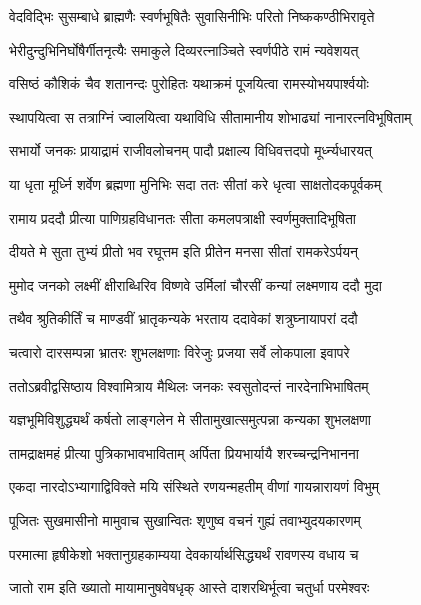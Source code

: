 \twolineshloka
{वेदविद्भिः सुसम्बाधे ब्राह्मणैः स्वर्णभूषितैः}
{सुवासिनीभिः परितो निष्ककण्ठीभिरावृते} %

\twolineshloka
{भेरीदुन्दुभिनिर्घोषैर्गीतनृत्यैः समाकुले}
{दिव्यरत्नाञ्चिते स्वर्णपीठे रामं न्यवेशयत्} %

\twolineshloka
{वसिष्ठं कौशिकं चैव शतानन्दः पुरोहितः}
{यथाक्रमं पूजयित्वा रामस्योभयपार्श्वयोः} %

\twolineshloka
{स्थापयित्वा स तत्राग्निं ज्वालयित्वा यथाविधि}
{सीतामानीय शोभाढ्यां नानारत्नविभूषिताम्} %

\twolineshloka
{सभार्यो जनकः प्रायाद्रामं राजीवलोचनम्}
{पादौ प्रक्षाल्य विधिवत्तदपो मूर्ध्न्यधारयत्} %

\twolineshloka
{या धृता मूर्ध्नि शर्वेण ब्रह्मणा मुनिभिः सदा}
{ततः सीतां करे धृत्वा साक्षतोदकपूर्वकम्} %

\twolineshloka
{रामाय प्रददौ प्रीत्या पाणिग्रहविधानतः}
{सीता कमलपत्राक्षी स्वर्णमुक्तादिभूषिता} %

\twolineshloka
{दीयते मे सुता तुभ्यं प्रीतो भव रघूत्तम}
{इति प्रीतेन मनसा सीतां रामकरेऽर्पयन्} %

\twolineshloka
{मुमोद जनको लक्ष्मीं क्षीराब्धिरिव विष्णवे}
{उर्मिलां चौरसीं कन्यां लक्ष्मणाय ददौ मुदा} %

\twolineshloka
{तथैव श्रुतिकीर्तिं च माण्डवीं भ्रातृकन्यके}
{भरताय ददावेकां शत्रुघ्नायापरां ददौ} %

\twolineshloka
{चत्वारो दारसम्पन्ना भ्रातरः शुभलक्षणाः}
{विरेजुः प्रजया सर्वे लोकपाला इवापरे} %

\twolineshloka
{ततोऽब्रवीद्वसिष्ठाय विश्वामित्राय मैथिलः}
{जनकः स्वसुतोदन्तं नारदेनाभिभाषितम्} %

\twolineshloka
{यज्ञभूमिविशुद्ध्यर्थं कर्षतो लाङ्गलेन मे}
{सीतामुखात्समुत्पन्ना कन्यका शुभलक्षणा} %

\twolineshloka
{तामद्राक्षमहं प्रीत्या पुत्रिकाभावभाविताम्}
{अर्पिता प्रियभार्यायै शरच्चन्द्रनिभानना} %

\twolineshloka
{एकदा नारदोऽभ्यागाद्विविक्ते मयि संस्थिते}
{रणयन्महतीम् वीणां गायन्नारायणं विभुम्} %

\twolineshloka
{पूजितः सुखमासीनो मामुवाच सुखान्वितः}
{शृणुष्व वचनं गुह्यं तवाभ्युदयकारणम्} %

\twolineshloka
{परमात्मा हृषीकेशो भक्तानुग्रहकाम्यया}
{देवकार्यार्थसिद्ध्यर्थं रावणस्य वधाय च} %

\twolineshloka
{जातो राम इति ख्यातो मायामानुषवेषधृक्}
{आस्ते दाशरथिर्भूत्वा चतुर्धा परमेश्वरः} %

